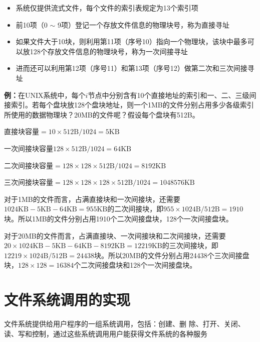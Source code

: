 \documentclass[cs4size,a4paper,10pt]{ctexart}
\begin{document}
	\begin{itemize}
		\item 系统仅提供流式文件，每个文件的索引表规定为13个索引项
		\item 前10项（0 $\sim$ 9项）登记一个存放文件信息的物理块号，称为直接寻址
		\item 如果文件大于10块，则利用第11项（序号10）指向一个物理块，该块中最多可以放128个存放文件信息的物理块号，称为一次间接寻址
		\item 进而还可以利用第12项（序号11）和第13项（序号12）做第二次和三次间接寻址
	\end{itemize}

	\textbf{例：}在UNIX系统中，每个$i$节点中分别含有10个直接地址的索引和一、二、三级间接索引。若每个盘块放128个盘块地址，则一个1MB的文件分别占用多少各级索引所使用的数据物理块？20MB的文件呢？假设每个盘块有512B。

	\begin{center}
		\begin{tcolorbox}[colback=white,%
			colframe=black,%
			width=\textwidth,
			arc=1mm, auto outer arc,
			boxrule=0.75pt,
		   ]
		直接块容量$=10\times 512\mathrm{B}/1024=5\mathrm{KB}$ 
		
		一次间接块容量$128\times 512\mathrm{B}/1024=64\mathrm{KB}$

		二次间接块容量$=128\times 128\times 512\mathrm{B}/1024=8192\mathrm{KB}$

		三次间接块容量$=128\times 128\times 128\times 512\mathrm{B}/1024=1048576\mathrm{KB}$

		对于1MB的文件而言，占满直接块和一次间接块，还需要$1024\mathrm{KB}-5\mathrm{KB}-64\mathrm{KB}=955\mathrm{KB}$的二次间接块，即$955\times 1024\mathrm{B}/512\mathrm{B}=1910$块。所以1MB的文件分别占用1910个二次间接盘块，128个一次间接盘块。

		对于20MB的文件而言，占满直接块、一次间接块和二次间接块，还需要$20\times 1024\mathrm{KB}-5\mathrm{KB}-64\mathrm{KB}-8192\mathrm{KB}=12219\mathrm{KB}$的三次间接块，即$12219\times 1024\mathrm{B}/512\mathrm{B}=24438$块。所以20MB的文件分别占用24438个三次间接盘块，$128\times 128=16384$个二次间接盘块和128个一次间接盘块。
		\end{tcolorbox}
	\end{center}

	\section{文件系统调用的实现}
	文件系统提供给用户程序的一组系统调用，包括：创建、删 除、打开、关闭、读、写和控制，通过这些系统调用用户能获得文件系统的各种服务
	
\end{document}
